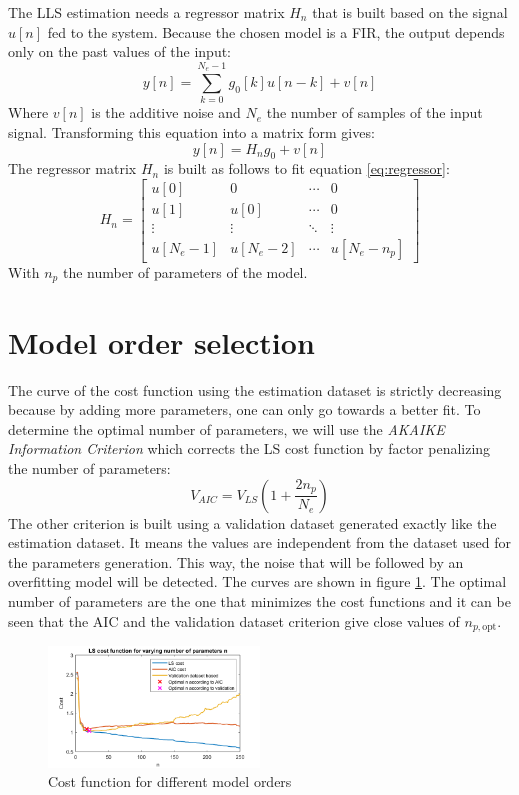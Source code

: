 \documentclass[10pt,twocolumn]{article}
\begin{document}
The LLS estimation needs a regressor matrix $H_n$ that is built based on the signal $u[n]$ fed to the system. Because the chosen model is a FIR, the output depends only on the past values of the input:
\begin{equation}
    \label{eq:regressor}
    y[n] = \sum_{k=0}^{N_e-1} g_0[k] u[n-k] + v[n]
\end{equation}
Where $v[n]$ is the additive noise and $N_e$ the number of samples of the input signal. Transforming this equation into a matrix form gives:
\begin{equation}
    y[n] = H_n g_0 + v[n]
\end{equation}
The regressor matrix $H_n$ is built as follows to fit equation \ref{eq:regressor}:
\begin{equation}
    H_n = \begin{bmatrix}
        u[0] & 0 & \cdots & 0 \\
        u[1] & u[0] & \cdots & 0 \\
        \vdots & \vdots & \ddots & \vdots \\
        u[N_e-1] & u[N_e-2] & \cdots & u[N_e-n_p]
    \end{bmatrix}
\end{equation}
With $n_p$ the number of parameters of the model.

\section{Model order selection}

The curve of the cost function using the estimation dataset is strictly decreasing because by adding more parameters, one can only go towards a better fit. To determine the optimal number of parameters, we will use the \textit{AKAIKE Information Criterion} which corrects the LS cost function by factor penalizing the number of parameters:
\begin{equation}
    V_{AIC} = V_{LS} \left(1+\frac{2n_p}{N_e}\right)
\end{equation}
The other criterion is built using a validation dataset generated exactly like the estimation dataset. It means the values are independent from the dataset used for the parameters generation. This way, the noise that will be followed by an overfitting model will be detected. The curves are shown in figure \ref{fig:costFunction}. The optimal number of parameters are the one that minimizes the cost functions and it can be seen that the AIC and the validation dataset criterion give close values of $n_{p, \text{opt}}$.
\begin{figure}
    \centering
    \includegraphics[width=0.5\textwidth]{pic/cost.png}
    \caption{Cost function for different model orders}
    \label{fig:costFunction}
\end{figure}
\end{document}
